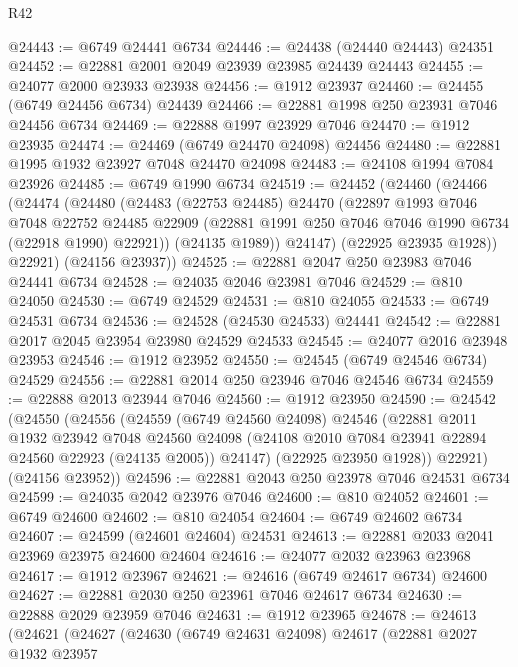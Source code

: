 \begin{lexlean}{R42}
\begin{coremodule}
{@24443 := @6749 @24441 @6734
@24446 := @24438 (@24440 @24443) @24351
@24452 := @22881 @2001 @2049 @23939 @23985 @24439 @24443
@24455 := @24077 @2000 @23933 @23938
@24456 := @1912 @23937
@24460 := @24455 (@6749 @24456 @6734) @24439
@24466 := @22881 @1998 @250 @23931 @7046 @24456 @6734
@24469 := @22888 @1997 @23929 @7046
@24470 := @1912 @23935
@24474 := @24469 (@6749 @24470 @24098) @24456
@24480 := @22881 @1995 @1932 @23927 @7048 @24470 @24098
@24483 := @24108 @1994 @7084 @23926
@24485 := @6749 @1990 @6734
@24519 := @24452
    (@24460
      (@24466
        (@24474
          (@24480
            (@24483
              (@22753 @24485)
              @24470
              (@22897
                @1993
                @7046
                @7048
                @22752
                @24485
                @22909
                (@22881 @1991 @250 @7046 @7046 @1990 @6734 (@22918 @1990) @22921))
              (@24135 @1989))
            @24147)
          (@22925 @23935 @1928))
        @22921)
      (@24156 @23937))
@24525 := @22881 @2047 @250 @23983 @7046 @24441 @6734
@24528 := @24035 @2046 @23981 @7046
@24529 := @810 @24050
@24530 := @6749 @24529
@24531 := @810 @24055
@24533 := @6749 @24531 @6734
@24536 := @24528 (@24530 @24533) @24441
@24542 := @22881 @2017 @2045 @23954 @23980 @24529 @24533
@24545 := @24077 @2016 @23948 @23953
@24546 := @1912 @23952
@24550 := @24545 (@6749 @24546 @6734) @24529
@24556 := @22881 @2014 @250 @23946 @7046 @24546 @6734
@24559 := @22888 @2013 @23944 @7046
@24560 := @1912 @23950
@24590 := @24542
    (@24550
      (@24556
        (@24559
          (@6749 @24560 @24098)
          @24546
          (@22881
            @2011
            @1932
            @23942
            @7048
            @24560
            @24098
            (@24108 @2010 @7084 @23941 @22894 @24560 @22923 (@24135 @2005))
            @24147)
          (@22925 @23950 @1928))
        @22921)
      (@24156 @23952))
@24596 := @22881 @2043 @250 @23978 @7046 @24531 @6734
@24599 := @24035 @2042 @23976 @7046
@24600 := @810 @24052
@24601 := @6749 @24600
@24602 := @810 @24054
@24604 := @6749 @24602 @6734
@24607 := @24599 (@24601 @24604) @24531
@24613 := @22881 @2033 @2041 @23969 @23975 @24600 @24604
@24616 := @24077 @2032 @23963 @23968
@24617 := @1912 @23967
@24621 := @24616 (@6749 @24617 @6734) @24600
@24627 := @22881 @2030 @250 @23961 @7046 @24617 @6734
@24630 := @22888 @2029 @23959 @7046
@24631 := @1912 @23965
@24678 := @24613
    (@24621
      (@24627
        (@24630
          (@6749 @24631 @24098)
          @24617
          (@22881
            @2027
            @1932
            @23957
}
\end{coremodule}
\end{lexlean}
